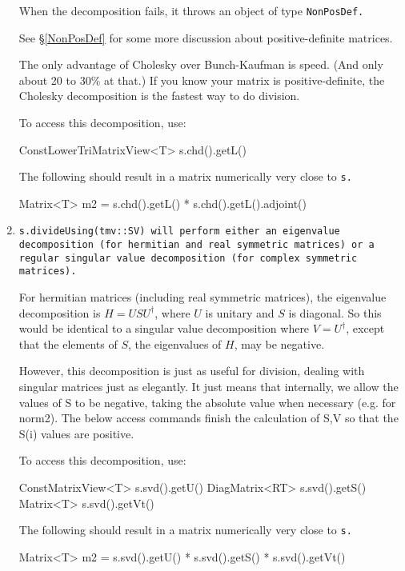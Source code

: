 \begin{enumerate}
When the decomposition fails, it throws an object of type
\tt{NonPosDef}.

See \S\ref{NonPosDef} for some more discussion about positive-definite
matrices.

The only advantage of Cholesky over Bunch-Kaufman is speed.  (And only about
20 to 30\% at that.)  If you know your 
matrix is positive-definite, the Cholesky decomposition is the fastest way to 
do division.

To access this decomposition, use:
\begin{tmvcode}
ConstLowerTriMatrixView<T> s.chd().getL()
\end{tmvcode}
The following should result in a matrix numerically very close to \tt{s}.
\begin{tmvcode}
Matrix<T> m2 = s.chd().getL() * s.chd().getL().adjoint()
\end{tmvcode}

\item
\tt{s.divideUsing(tmv::SV)} will perform either an eigenvalue decomposition
(for hermitian and real symmetric matrices) or a regular singular value
decomposition (for complex symmetric matrices).

For hermitian matrices (including real symmetric matrices), 
the eigenvalue decomposition is $H = U S U^\dagger$, where $U$ is
unitary and $S$ is diagonal.  So this would be identical to a singular
value decomposition where $V = U^\dagger$, 
except that the elements of $S$, the eigenvalues of $H$, may be negative.

However, this decomposition is just as useful for division, dealing with singular
matrices just as elegantly.  It just means that internally, we allow the values
of S to be negative, taking the absolute value when necessary (e.g. for norm2).
The below access commands finish the calculation of S,V so that the S(i)
values are positive. 

To access this decomposition, use:
\begin{tmvcode}
ConstMatrixView<T> s.svd().getU()
DiagMatrix<RT> s.svd().getS()
Matrix<T> s.svd().getVt()
\end{tmvcode}
The following should result in a matrix numerically very close to \tt{s}.
\begin{tmvcode}
Matrix<T> m2 = s.svd().getU() * s.svd().getS() * s.svd().getVt()
\end{tmvcode}


\end{enumerate}
